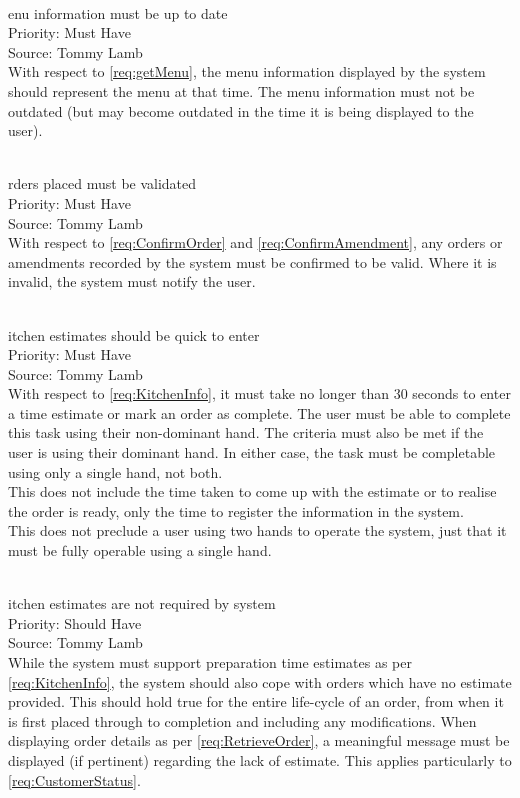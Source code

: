 \documentclass[11pt, a4paper]{report}
\def\itempar#1\\{\item \textbf{#1}\\} %
\begin{document}
\begin{enumerate}[label=NF-UR-\arabic*, series=nonfunctional]
\begin{enumerate}[label*=.\arabic*]
\end{enumerate}

\itempar Menu information must be up to date\\
Priority: Must Have\\
Source: Tommy Lamb\\
With respect to \autoref{req:getMenu}, the menu information displayed by the system should represent the menu at that time. The menu information must not be outdated (but may become outdated in the time it is being displayed to the user).

\itempar Orders placed must be validated\\
Priority: Must Have\\
Source: Tommy Lamb\\
With respect to \autoref{req:ConfirmOrder} and \autoref{req:ConfirmAmendment}, any orders or amendments recorded by the system must be confirmed to be valid. Where it is invalid, the system must notify the user.

\itempar Kitchen estimates should be quick to enter\\
Priority: Must Have\\
Source: Tommy Lamb\\
With respect to \autoref{req:KitchenInfo}, it must take no longer than 30 seconds to enter a time estimate or mark an order as complete. The user must be able to complete this task using their non-dominant hand. The criteria must also be met if the user is using their dominant hand. In either case, the task must be completable using only a single hand, not both.\\
This does not include the time taken to come up with the estimate or to realise the order is ready, only the time to register the information in the system.\\
This does not preclude a user using two hands to operate the system, just that it must be fully operable using a single hand.

\itempar Kitchen estimates are not required by system\\
Priority: Should Have\\
Source: Tommy Lamb\\
While the system must support preparation time estimates as per \autoref{req:KitchenInfo}, the system should also cope with orders which have no estimate provided. This should hold true for the entire life-cycle of an order, from when it is first placed through to completion and including any modifications. When displaying order details as per \autoref{req:RetrieveOrder}, a meaningful message must be displayed (if pertinent) regarding the lack of estimate. This applies particularly to \autoref{req:CustomerStatus}.


\end{enumerate}
\end{document}
